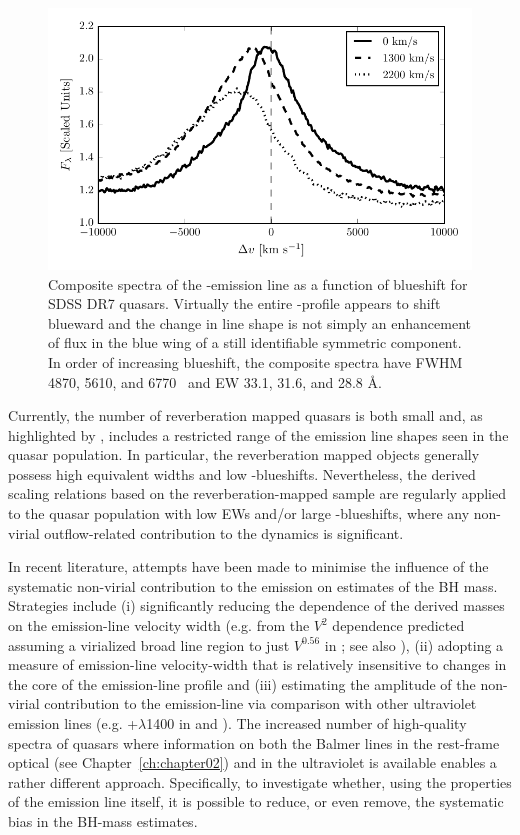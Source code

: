 \begin{figure}
    \includegraphics[width=0.8\linewidth]{figures/chapter02/civ_composites.pdf}
    \caption{Composite spectra of the -emission line as a function of  blueshift for SDSS DR7 quasars. Virtually the entire -profile appears to shift blueward and the change in line shape is not simply an enhancement of flux in the blue wing of a still identifiable symmetric component. In order of increasing  blueshift, the composite spectra have FWHM 4870, 5610, and 6770 \kms\, and EW 33.1, 31.6, and 28.8 \AA.}
    \label{fig:civ_composites}
\end{figure}

Currently, the number of reverberation mapped quasars is both small \citep[$\sim$50 quasars;][]{park13} and, as highlighted by \citet{richards11}, includes a restricted range of the  emission line shapes seen in the quasar population. 
In particular, the reverberation mapped objects generally possess high  equivalent widths and low -blueshifts. 
Nevertheless, the derived scaling relations based on the reverberation-mapped sample are regularly applied to the quasar population with low  EWs and/or large -blueshifts, where any non-virial outflow-related contribution to the dynamics is significant. 

In recent literature, attempts have been made to minimise the influence of the systematic non-virial contribution to the  emission on estimates of the BH mass. 
Strategies include (i) significantly reducing the dependence of the derived masses on the emission-line velocity width (e.g. from the $V^2$ dependence predicted assuming a virialized broad line region to just $V^{0.56}$ in \citealt{park13}; see also \citealt{shen12}), (ii) adopting a measure of emission-line velocity-width that is relatively insensitive to changes in the core of the emission-line profile \citep[e.g.][]{denney13} and (iii) estimating the amplitude of the non-virial contribution to the  emission-line via comparison with other ultraviolet emission lines (e.g. +$\lambda$1400 in \citealt{runnoe13} and \citealt{brotherton15}).
The increased number of high-quality spectra of quasars where information on both the Balmer lines in the rest-frame optical (see Chapter~\ref{ch:chapter02}) and  in the ultraviolet is available enables a rather different approach. 
Specifically, to investigate whether, using the properties of the  emission line itself, it is possible to reduce, or even remove, the systematic bias in the BH-mass estimates. 


